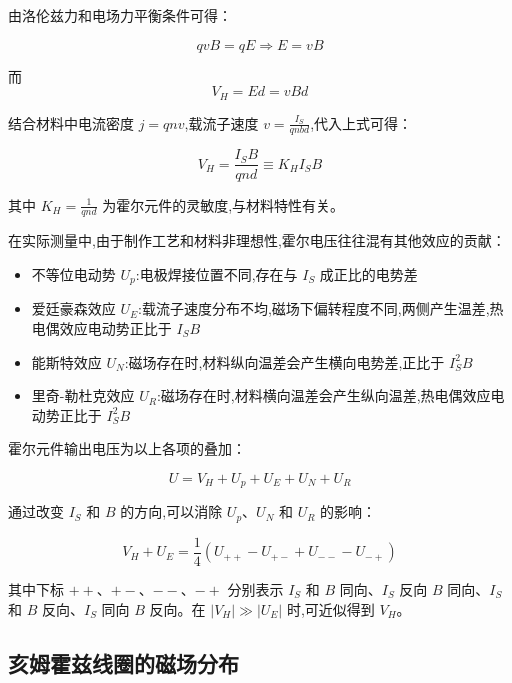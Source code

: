 \documentclass[UTF8]{ctexart}
\begin{document}
    由洛伦兹力和电场力平衡条件可得：
    
    \begin{equation}
    qvB = qE \Rightarrow E=vB
    \end{equation}
    
    而
    \begin{equation}
    V_H = Ed = vBd
    \end{equation}
    
    结合材料中电流密度 $j=qnv$,载流子速度 $v=\frac{I_S}{qnbd}$,代入上式可得：
    
    \begin{equation}
    V_H = \frac{I_SB}{qnd} \equiv K_HI_SB
    \end{equation}
    
    其中 $K_H=\frac{1}{qnd}$ 为霍尔元件的灵敏度,与材料特性有关。
    
    在实际测量中,由于制作工艺和材料非理想性,霍尔电压往往混有其他效应的贡献：
    \begin{itemize}
      \item 不等位电动势 $U_p$:电极焊接位置不同,存在与 $I_S$ 成正比的电势差
      \item 爱廷豪森效应 $U_E$:载流子速度分布不均,磁场下偏转程度不同,两侧产生温差,热电偶效应电动势正比于 $I_SB$ 
      \item 能斯特效应 $U_N$:磁场存在时,材料纵向温差会产生横向电势差,正比于 $I_S^2B$
      \item 里奇-勒杜克效应 $U_R$:磁场存在时,材料横向温差会产生纵向温差,热电偶效应电动势正比于 $I_S^2B$
    \end{itemize}
    
    霍尔元件输出电压为以上各项的叠加：
    
    \begin{equation}
    U = V_H + U_p + U_E + U_N + U_R
    \end{equation}
    
    通过改变 $I_S$ 和 $B$ 的方向,可以消除 $U_p$、$U_N$ 和 $U_R$ 的影响：
    
    \begin{equation}
    V_H + U_E = \frac{1}{4}(U_{++} - U_{+-} + U_{--} - U_{-+})  
    \end{equation}
    
    其中下标 $++$、$+-$、$--$、$-+$ 分别表示 $I_S$ 和 $B$ 同向、$I_S$ 反向 $B$ 同向、$I_S$ 和 $B$ 反向、$I_S$ 同向 $B$ 反向。在 $|V_H| \gg |U_E|$ 时,可近似得到 $V_H$。
    
    \subsection{亥姆霍兹线圈的磁场分布}
    
\end{document}
